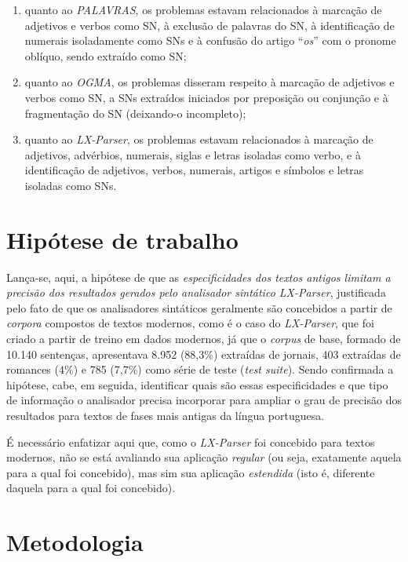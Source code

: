 \documentclass[portuguese]{textolivre}
\begin{document}
\begin{enumerate}[label=\alph*.]
    \item quanto ao \textit{PALAVRAS}, os problemas estavam relacionados à marcação de adjetivos e verbos como SN, à exclusão de palavras do SN, à identificação de numerais isoladamente como SNs e à confusão do artigo “\textit{os}” com o pronome oblíquo, sendo extraído como SN;
    \item quanto ao \textit{OGMA}, os problemas disseram respeito à marcação de adjetivos e verbos como SN, a SNs extraídos iniciados por preposição ou conjunção e à fragmentação do SN (deixando-o incompleto);
    \item quanto ao \textit{LX-Parser}, os problemas estavam relacionados à marcação de adjetivos, advérbios, numerais, siglas e  letras isoladas como verbo, e à identificação de adjetivos, verbos, numerais, artigos e  símbolos e letras isoladas como SNs.
\end{enumerate}

\section{Hipótese de trabalho}

Lança-se, aqui, a hipótese de que as \textit{especificidades dos textos antigos limitam a precisão dos resultados gerados pelo analisador sintático LX-Parser},  justificada pelo fato de que os analisadores sintáticos geralmente são concebidos a partir de \textit{corpora} compostos de textos modernos, como é o caso do \textit{LX-Parser}, que foi criado a partir de treino em dados modernos, já que o \textit{corpus} de base, formado de 10.140 sentenças, apresentava 8.952 (88,3\%) extraídas de jornais, 403 extraídas de romances (4\%) e 785 (7,7\%) como série de teste (\textit{test suite}). Sendo confirmada a hipótese, cabe, em seguida, identificar quais são essas especificidades e que tipo de informação o analisador precisa incorporar para ampliar o grau de precisão dos resultados para textos de fases mais antigas da língua portuguesa.

É necessário enfatizar aqui que, como o \textit{LX-Parser} foi concebido para textos modernos, não se está avaliando sua aplicação \textit{regular} (ou seja, exatamente aquela para a qual foi concebido), mas sim sua aplicação \textit{estendida} (isto é, diferente daquela para a qual foi concebido).

\section{Metodologia}
\end{document}
